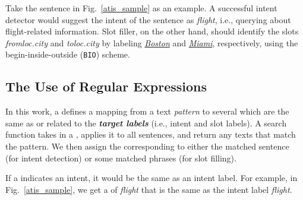 
Take the sentence in Fig.~\ref{atis_sample} as an example. 
A successful intent detector would suggest the intent of the sentence as \emph{flight}, i.e., querying
about flight-related information. Slot filler, on the other hand, should identify the slots \emph{fromloc.city} and
\emph{toloc.city} by labeling \underline{\textit{Boston}} and \underline{\textit{Miami}}, respectively,
using the begin-inside-outside (\texttt{BIO}) scheme.




\subsection{The Use of Regular Expressions}
\label{re_desc}

In this work, a \RE defines a mapping from a text \emph{pattern} to several \textbf{\emph{\REtags}} which are  the same as or related to the
\textbf{\emph{target labels}} (i.e., intent and slot labels). A search function takes in a \RE, applies it to all sentences, and return
any texts that match the pattern. %
We then assign the corresponding \REtag to either the matched sentence (for intent detection) or some matched phrases (for slot filling).


If a \REtag indicates an intent, it would be the same as an intent label. 
For example,  %
in Fig.~\ref{atis_sample},
we get a \REtag of \emph{flight} that is the same as %
 the intent label \emph{flight}.



